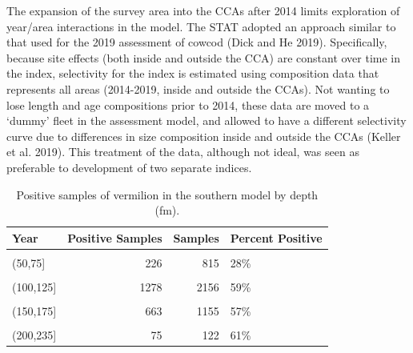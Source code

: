 \documentclass[11pt,
  english,
  a4paper,
]{article}
\begin{document}
The expansion of the survey area into the CCAs after 2014 limits exploration of year/area interactions in the model. The STAT adopted an approach similar to that used for the 2019 assessment of cowcod {(Dick and He 2019)\leavevmode\tagmcend\tagstructend}. Specifically, because site effects (both inside and outside the CCA) are constant over time in the index, selectivity for the index is estimated using composition data that represents all areas (2014-2019, inside and outside the CCAs). Not wanting to lose length and age compositions prior to 2014, these data are moved to a `dummy' fleet in the assessment model, and allowed to have a different selectivity curve due to differences in size composition inside and outside the CCAs {(Keller et al. 2019)\leavevmode\tagmcend\tagstructend}. This treatment of the data, although not ideal, was seen as preferable to development of two separate indices.

\newpage

\begin{table}

\caption{\label{tab:tab-depth-nwfschl}Positive samples of vermilion in the southern model by depth (fm).}
\centering
\begin{tabular}[t]{lrrl}
\toprule
Year & Positive Samples & Samples & Percent Positive\\
\midrule
\cellcolor{gray!6}{(0,50]} & \cellcolor{gray!6}{85} & \cellcolor{gray!6}{295} & \cellcolor{gray!6}{29\%}\\
(50,75] & 226 & 815 & 28\%\\
\cellcolor{gray!6}{(75,100]} & \cellcolor{gray!6}{1697} & \cellcolor{gray!6}{3847} & \cellcolor{gray!6}{44\%}\\
(100,125] & 1278 & 2156 & 59\%\\
\cellcolor{gray!6}{(125,150]} & \cellcolor{gray!6}{917} & \cellcolor{gray!6}{1594} & \cellcolor{gray!6}{58\%}\\
\addlinespace
(150,175] & 663 & 1155 & 57\%\\
\cellcolor{gray!6}{(175,200]} & \cellcolor{gray!6}{234} & \cellcolor{gray!6}{456} & \cellcolor{gray!6}{51\%}\\
(200,235] & 75 & 122 & 61\%\\
\bottomrule
\end{tabular}
\end{table}
\end{document}
